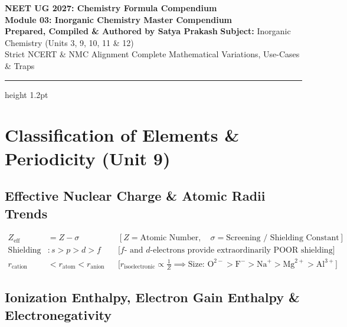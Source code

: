 \documentclass[11pt,a4paper]{article}
\begin{document}
\begin{center}
  {\huge\bfseries\color{primarydark} NEET UG 2027: Chemistry Formula Compendium}\\[6pt]
  {\Large\bfseries\color{accentblue} Module 03: Inorganic Chemistry Master Compendium}\\[8pt]
  {\normalsize\textbf{Prepared, Compiled \& Authored by Satya Prakash} \quad\textbar\quad \textbf{Subject:} Inorganic Chemistry (Units 3, 9, 10, 11 \& 12)}\\[4pt]
  {\footnotesize\color{gray} Strict NCERT \& NMC Alignment \quad\textbar\quad Complete Mathematical Variations, Use-Cases \& Traps}
\end{center}
\vspace{-2pt}
\hrule height 1.2pt
\vspace{8pt}

\section{Classification of Elements \& Periodicity (Unit 9)}

\subsection{Effective Nuclear Charge \& Atomic Radii Trends}

\begin{formulabox}
\begin{align}
  Z_{\text{eff}} &= Z - \sigma && [Z = \text{Atomic Number}, \quad \sigma = \text{Screening / Shielding Constant}] \\
  \text{Shielding Power Order} &: s > p > d > f && \text{[$f$- and $d$-electrons provide extraordinarily POOR shielding]} \\
  r_{\text{cation}} &< r_{\text{atom}} < r_{\text{anion}} && \text{[$r_{\text{isoelectronic}} \propto \frac{1}{Z} \implies \text{Size: } \text{O}^{2-} > \text{F}^- > \text{Na}^+ > \text{Mg}^{2+} > \text{Al}^{3+}$]}
\end{align}
\end{formulabox}

\subsection{Ionization Enthalpy, Electron Gain Enthalpy \& Electronegativity}
\end{document}
